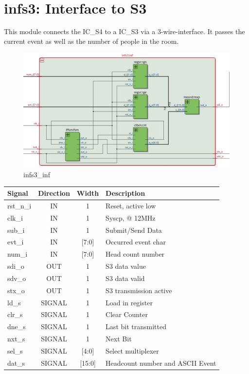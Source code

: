 \documentclass[12pt,a4 paper] {report}
\begin{document}
\section{infs3: Interface to S3}
This module connects the IC\_S4 to a IC\_S3 via a 3-wire-interface. It passes the current event as well as the number 
of people in the room.
\begin{figure}[h]
	\centering	
	\includegraphics[scale=0.25]{../png/infs3_inf.png}
	\caption{infs3\_inf}
\end{figure}
\begin{center}
	\begin{tabular}{ | p{2cm} | c | c | p{5cm} |}
		\hline
		\textbf{Signal} & \textbf{Direction} & \textbf{Width} & \textbf{Description} \\
		\hline
		\hline
		rst\_n\_i & IN & 1 & Reset, active low \\
		\hline
		clk\_i & IN & 1 & Syscp, @ 12MHz \\
		\hline
		sub\_i & IN & 1 & Submit/Send Data \\
		\hline
		evt\_i & IN & [7:0] & Occurred event char \\
		\hline
		num\_i & IN & [7:0] & Head count number \\
		\hline
		sdi\_o & OUT & 1 & S3 data value \\
		\hline
		sdv\_o & OUT & 1 & S3 data valid \\
		\hline
		stx\_o & OUT & 1 & S3 transmission active\\
		\hline
		\hline
		ld\_s & SIGNAL & 1 & Load in register \\
		\hline
		clr\_s & SIGNAL & 1 & Clear Counter \\
		\hline
		dne\_s & SIGNAL & 1 & Last bit transmitted \\
		\hline
		nxt\_s & SIGNAL & 1 & Next Bit \\
		\hline
		sel\_s & SIGNAL & [4:0] & Select multiplexer \\
		\hline
		dat\_s & SIGNAL & [15:0] & Headcount number and ASCII Event \\
		\hline
	\end{tabular}
\end{center}
\newpage
\end{document}
